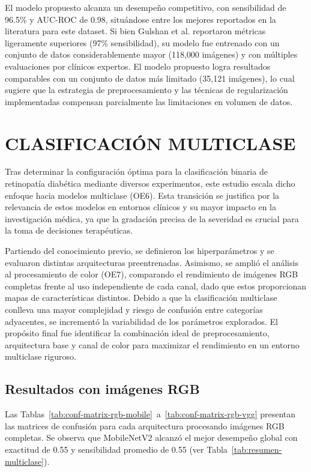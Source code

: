 El modelo propuesto alcanza un desempeño competitivo, con sensibilidad de 96.5\% y 
AUC-ROC de 0.98, situándose entre los mejores reportados en la literatura para este 
dataset. Si bien Gulshan et al. reportaron métricas ligeramente superiores (97\% 
sensibilidad), su modelo fue entrenado con un conjunto de datos considerablemente mayor 
(118,000 imágenes) y con múltiples evaluaciones por clínicos expertos. El modelo 
propuesto logra resultados comparables con un conjunto de datos más limitado (35,121 
imágenes), lo cual sugiere que la estrategia de preprocesamiento y las técnicas de 
regularización implementadas compensan parcialmente las limitaciones en volumen de datos.

\section{CLASIFICACIÓN MULTICLASE}

Tras determinar la configuración óptima para la clasificación binaria de retinopatía 
diabética mediante diversos experimentos, este estudio escala dicho enfoque hacia modelos 
multiclase (OE6). Esta transición se justifica por la relevancia de estos modelos en 
entornos clínicos y su mayor impacto en la investigación médica, ya que la gradación 
precisa de la severidad es crucial para la toma de decisiones terapéuticas.

Partiendo del conocimiento previo, se definieron los hiperparámetros y se evaluaron 
distintas arquitecturas preentrenadas. Asimismo, se amplió el análisis al procesamiento 
de color (OE7), comparando el rendimiento de imágenes RGB completas frente al uso 
independiente de cada canal, dado que estos proporcionan mapas de características 
distintos. Debido a que la clasificación multiclase conlleva una mayor complejidad y 
riesgo de confusión entre categorías adyacentes, se incrementó la variabilidad de los 
parámetros explorados. El propósito final fue identificar la combinación ideal de 
preprocesamiento, arquitectura base y canal de color para maximizar el rendimiento en un 
entorno multiclase riguroso.

\subsection{Resultados con imágenes RGB}

Las Tablas~\ref{tab:conf-matrix-rgb-mobile}~a~\ref{tab:conf-matrix-rgb-vgg} presentan las 
matrices de confusión para cada arquitectura procesando imágenes RGB completas. Se 
observa que MobileNetV2 alcanzó el mejor desempeño global con exactitud de 0.55 y 
sensibilidad promedio de 0.55 (ver Tabla~\ref{tab:resumen-multiclase}).

